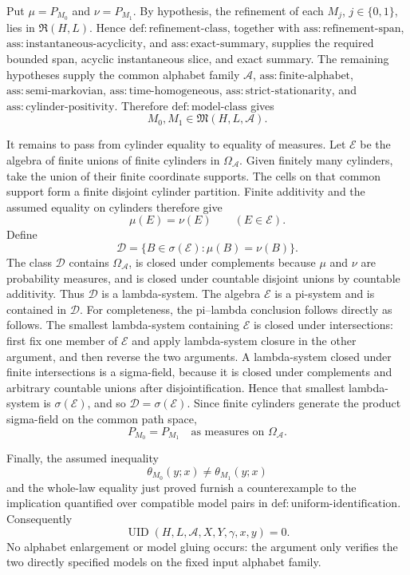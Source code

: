 Put \(\mu=P_{M_0}\) and \(\nu=P_{M_1}\).  By hypothesis, the refinement of each \(M_j\), \(j\in\{0,1\}\), lies in \(\mathfrak R(H,L)\).  Hence \(\mathrm{def:refinement\text{-}class}\), together with \(\mathrm{ass:refinement\text{-}span}\), \(\mathrm{ass:instantaneous\text{-}acyclicity}\), and \(\mathrm{ass:exact\text{-}summary}\), supplies the required bounded span, acyclic instantaneous slice, and exact summary.  The remaining hypotheses supply the common alphabet family \(\mathcal A\), \(\mathrm{ass:finite\text{-}alphabet}\), \(\mathrm{ass:semi\text{-}markovian}\), \(\mathrm{ass:time\text{-}homogeneous}\), \(\mathrm{ass:strict\text{-}stationarity}\), and \(\mathrm{ass:cylinder\text{-}positivity}\).  Therefore \(\mathrm{def:model\text{-}class}\) gives
\[
 M_0,M_1\in\mathfrak M(H,L,\mathcal A).
\]

It remains to pass from cylinder equality to equality of measures.  Let \(\mathscr E\) be the algebra of finite unions of finite cylinders in \(\Omega_{\mathcal A}\).  Given finitely many cylinders, take the union of their finite coordinate supports.  The cells on that common support form a finite disjoint cylinder partition.  Finite additivity and the assumed equality on cylinders therefore give
\[
 \mu(E)=\nu(E)\qquad(E\in\mathscr E).
\]
Define
\[
 \mathscr D=\{B\in\sigma(\mathscr E):\mu(B)=\nu(B)\}.
\]
The class \(\mathscr D\) contains \(\Omega_{\mathcal A}\), is closed under complements because \(\mu\) and \(\nu\) are probability measures, and is closed under countable disjoint unions by countable additivity.  Thus \(\mathscr D\) is a lambda-system.  The algebra \(\mathscr E\) is a pi-system and is contained in \(\mathscr D\).  For completeness, the pi--lambda conclusion follows directly as follows.  The smallest lambda-system containing \(\mathscr E\) is closed under intersections: first fix one member of \(\mathscr E\) and apply lambda-system closure in the other argument, and then reverse the two arguments.  A lambda-system closed under finite intersections is a sigma-field, because it is closed under complements and arbitrary countable unions after disjointification.  Hence that smallest lambda-system is \(\sigma(\mathscr E)\), and so \(\mathscr D=\sigma(\mathscr E)\).  Since finite cylinders generate the product sigma-field on the common path space,
\[
 P_{M_0}=P_{M_1}\quad\text{as measures on }\Omega_{\mathcal A}.
\]

Finally, the assumed inequality
\[
 \theta_{M_0}(y;x)\ne\theta_{M_1}(y;x)
\]
and the whole-law equality just proved furnish a counterexample to the implication quantified over compatible model pairs in \(\mathrm{def:uniform\text{-}identification}\).  Consequently
\[
 \operatorname{UID}(H,L,\mathcal A,X,Y,\gamma,x,y)=0.
\]
No alphabet enlargement or model gluing occurs: the argument only verifies the two directly specified models on the fixed input alphabet family.

